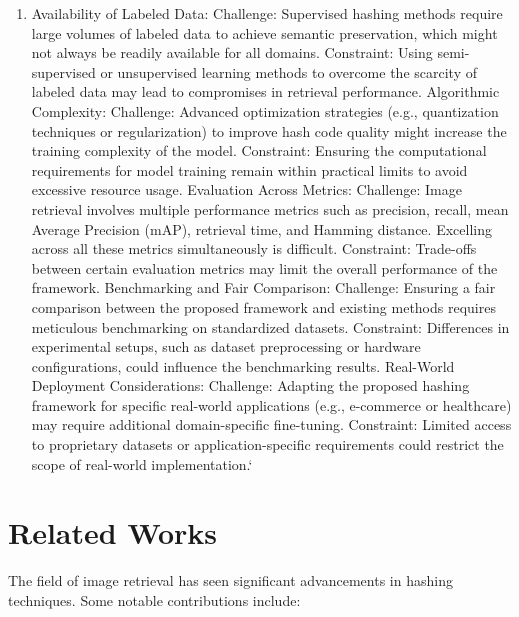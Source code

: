 \documentclass[conference]{IEEEtran}
\begin{document}
\begin{enumerate}
\begin{itemize}
    \end{itemize}

    \item Availability of Labeled Data:
    Challenge: Supervised hashing methods require large volumes of labeled data to achieve semantic preservation, which might not always be readily available for all domains.
    Constraint: Using semi-supervised or unsupervised learning methods to overcome the scarcity of labeled data may lead to compromises in retrieval performance.
    Algorithmic Complexity:
    Challenge: Advanced optimization strategies (e.g., quantization techniques or regularization) to improve hash code quality might increase the training complexity of the model.
    Constraint: Ensuring the computational requirements for model training remain within practical limits to avoid excessive resource usage.
    Evaluation Across Metrics:
    Challenge: Image retrieval involves multiple performance metrics such as precision, recall, mean Average Precision (mAP), retrieval time, and Hamming distance. Excelling across all these metrics simultaneously is difficult.
    Constraint: Trade-offs between certain evaluation metrics may limit the overall performance of the framework.
    Benchmarking and Fair Comparison:
    Challenge: Ensuring a fair comparison between the proposed framework and existing methods requires meticulous benchmarking on standardized datasets.
    Constraint: Differences in experimental setups, such as dataset preprocessing or hardware configurations, could influence the benchmarking results.
    Real-World Deployment Considerations:
    Challenge: Adapting the proposed hashing framework for specific real-world applications (e.g., e-commerce or healthcare) may require additional domain-specific fine-tuning.
    Constraint: Limited access to proprietary datasets or application-specific requirements could restrict the scope of real-world implementation.`
    
\end{enumerate}

\section{Related Works}

The field of image retrieval has seen significant advancements in hashing techniques. Some notable contributions include:
\end{document}
